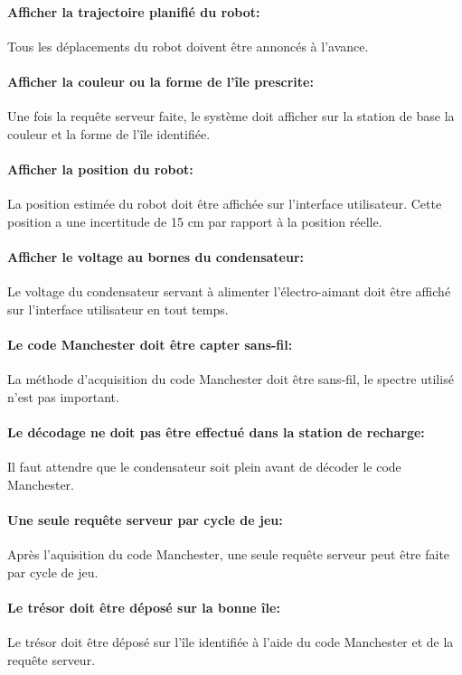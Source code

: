 \paragraph{Afficher la trajectoire planifié du robot:}
Tous les déplacements du robot doivent être annoncés à l'avance.

\paragraph{Afficher la couleur ou la forme de l'île prescrite:} Une fois la requête serveur faite, le système doit afficher sur la station de base la couleur et la forme de l'île identifiée.

\paragraph{Afficher la position du robot:}
La position estimée du robot doit être affichée sur l'interface utilisateur. Cette position a une incertitude de 15 cm par rapport à la position réelle.

\paragraph{Afficher le voltage au bornes du condensateur:}
Le voltage du condensateur servant à alimenter l'électro-aimant doit être affiché sur l'interface utilisateur en tout temps.

\paragraph{Le code Manchester doit être capter sans-fil:}
La méthode d'acquisition du code Manchester doit être sans-fil, le spectre utilisé n'est pas important.

\paragraph{Le décodage ne doit pas être effectué dans la station de recharge:}
Il faut attendre que le condensateur soit plein avant de décoder le code Manchester.

\paragraph{Une seule requête serveur par cycle de jeu:}
Après l'aquisition du code Manchester, une seule requête serveur peut être faite par cycle de jeu.

\paragraph{Le trésor doit être déposé sur la bonne île:}
Le trésor doit être déposé sur l'île identifiée à l'aide du code Manchester et de la requête serveur.

